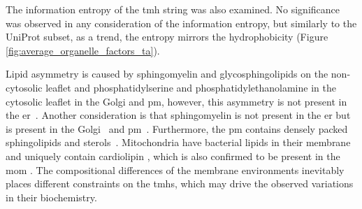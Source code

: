 The information entropy of the \gls{tmh} string was also examined.
No significance was observed in any consideration of the information entropy, but similarly to the UniProt subset, as a trend, the entropy mirrors the hydrophobicity (Figure \ref{fig:average_organelle_factors_ta}).

Lipid asymmetry is caused by sphingomyelin and glycosphingolipids on the non\--cytosolic leaflet and phosphatidylserine and phosphatidylethanolamine in the cytosolic leaflet in the Golgi and \gls{pm}, however, this asymmetry is not present in the \gls{er}~\cite{Daleke2007, Devaux2004}.
Another consideration is that sphingomyelin is not present in the \gls{er} but is present in the Golgi~\cite{Futerman2005} and \gls{pm}~\cite{Li2007, Tafesse2007}.
Furthermore, the \gls{pm} contains densely packed sphingolipids and sterols~\cite{Paolo2006}.
Mitochondria have bacterial lipids in their membrane and uniquely contain cardiolipin \cite{Choi2005}, which is also confirmed to be present in the \gls{mom} \cite{Gebert2009}.
The compositional differences of the membrane environments inevitably places different constraints on the \gls{tmh}s, which may drive the observed variations in their biochemistry.

